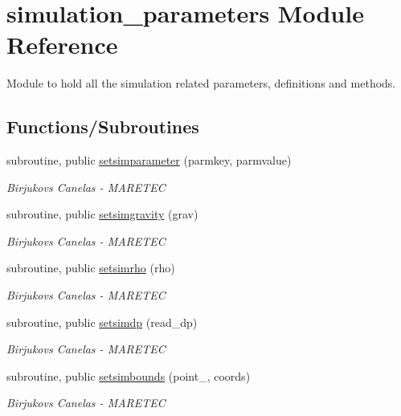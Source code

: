 \hypertarget{namespacesimulation__parameters}{}\section{simulation\+\_\+parameters Module Reference}
\label{namespacesimulation__parameters}


Module to hold all the simulation related parameters, definitions and methods.  


\subsection*{Functions/\+Subroutines}
\begin{DoxyCompactItemize}
\item 
subroutine, public \mbox{\hyperlink{namespacesimulation__parameters_af905a4701f68f0ad0a50606101fda7d6}{setsimparameter}} (parmkey, parmvalue)
\begin{DoxyCompactList}\small\item\em Birjukovs Canelas -\/ M\+A\+R\+E\+T\+EC \end{DoxyCompactList}\item 
subroutine, public \mbox{\hyperlink{namespacesimulation__parameters_a21b04e29ccee801263abc6e27fba026f}{setsimgravity}} (grav)
\begin{DoxyCompactList}\small\item\em Birjukovs Canelas -\/ M\+A\+R\+E\+T\+EC \end{DoxyCompactList}\item 
subroutine, public \mbox{\hyperlink{namespacesimulation__parameters_a4190b1bba60a505d50ba93973f158e5f}{setsimrho}} (rho)
\begin{DoxyCompactList}\small\item\em Birjukovs Canelas -\/ M\+A\+R\+E\+T\+EC \end{DoxyCompactList}\item 
subroutine, public \mbox{\hyperlink{namespacesimulation__parameters_a757c1773e1c21deb9f3bfd2dc258bd1a}{setsimdp}} (read\+\_\+dp)
\begin{DoxyCompactList}\small\item\em Birjukovs Canelas -\/ M\+A\+R\+E\+T\+EC \end{DoxyCompactList}\item 
subroutine, public \mbox{\hyperlink{namespacesimulation__parameters_a71f285f54b412efac79d40c9ecd58037}{setsimbounds}} (point\+\_\+, coords)
\begin{DoxyCompactList}\small\item\em Birjukovs Canelas -\/ M\+A\+R\+E\+T\+EC \end{DoxyCompactList}\end{DoxyCompactItemize}
